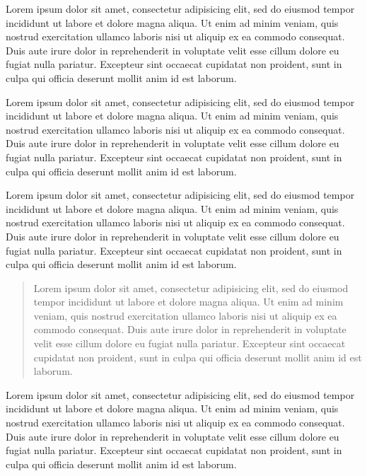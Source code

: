 \documentclass{tcc_dcomp}
\begin{document}
  \capa
  \contracapa
  \begin{banca}
    Lorem ipsum dolor sit amet, consectetur adipisicing elit, sed do eiusmod tempor
    incididunt ut labore et dolore magna aliqua. Ut enim ad minim veniam, quis
    nostrud exercitation ullamco laboris nisi ut aliquip ex ea commodo consequat.
    Duis aute irure dolor in reprehenderit in voluptate velit esse cillum dolore eu
    fugiat nulla pariatur. Excepteur sint occaecat cupidatat non proident, sunt in
    culpa qui officia deserunt mollit anim id est laborum.
  \end{banca}
  \begin{agradecimentos}
    Lorem ipsum dolor sit amet, consectetur adipisicing elit, sed do eiusmod tempor
    incididunt ut labore et dolore magna aliqua. Ut enim ad minim veniam, quis
    nostrud exercitation ullamco laboris nisi ut aliquip ex ea commodo consequat.
    Duis aute irure dolor in reprehenderit in voluptate velit esse cillum dolore eu
    fugiat nulla pariatur. Excepteur sint occaecat cupidatat non proident, sunt in
    culpa qui officia deserunt mollit anim id est laborum.
  \end{agradecimentos}
  \begin{resumo}
    Lorem ipsum dolor sit amet, consectetur adipisicing elit, sed do eiusmod tempor
    incididunt ut labore et dolore magna aliqua. Ut enim ad minim veniam, quis
    nostrud exercitation ullamco laboris nisi ut aliquip ex ea commodo consequat.
    Duis aute irure dolor in reprehenderit in voluptate velit esse cillum dolore eu
    fugiat nulla pariatur. Excepteur sint occaecat cupidatat non proident, sunt in
    culpa qui officia deserunt mollit anim id est laborum.
  \end{resumo}
  \begin{abstract}
    Lorem ipsum dolor sit amet, consectetur adipisicing elit, sed do eiusmod tempor
    incididunt ut labore et dolore magna aliqua. Ut enim ad minim veniam, quis
    nostrud exercitation ullamco laboris nisi ut aliquip ex ea commodo consequat.
    Duis aute irure dolor in reprehenderit in voluptate velit esse cillum dolore eu
    fugiat nulla pariatur. Excepteur sint occaecat cupidatat non proident, sunt in
    culpa qui officia deserunt mollit anim id est laborum.
  \end{abstract}
  \listadefiguras
  \listadetabelas
  \begin{listadeabreviaturas}
    Lorem ipsum dolor sit amet, consectetur adipisicing elit, sed do eiusmod tempor
    incididunt ut labore et dolore magna aliqua. Ut enim ad minim veniam, quis
    nostrud exercitation ullamco laboris nisi ut aliquip ex ea commodo consequat.
    Duis aute irure dolor in reprehenderit in voluptate velit esse cillum dolore eu
    fugiat nulla pariatur. Excepteur sint occaecat cupidatat non proident, sunt in
    culpa qui officia deserunt mollit anim id est laborum.
  \end{listadeabreviaturas}
  \sumario
\end{document}

